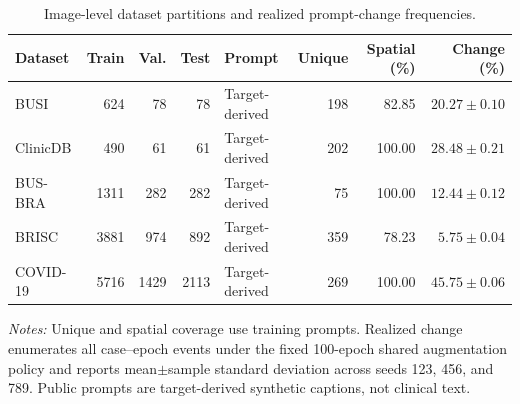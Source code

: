 
\ifnum{}
\begin{table}[htbp]
\centering
\caption{Image-level dataset partitions and realized prompt-change frequencies.}
\label{tab:bspc_dataset_audit}
\scriptsize
\setlength{\tabcolsep}{2.0pt}
\begin{tabular}{@{}lrrrlrrr@{}}
\toprule
Dataset & Train & Val. & Test & Prompt & Unique & Spatial (\%) & Change (\%) \\
\midrule
BUSI     & 624  & 78  & 78   & Target-derived & 198 & 82.85 & $20.27\pm0.10$ \\
ClinicDB & 490  & 61  & 61   & Target-derived & 202 & 100.00 & $28.48\pm0.21$ \\
BUS-BRA  & 1311 & 282 & 282  & Target-derived & 75  & 100.00 & $12.44\pm0.12$ \\
BRISC    & 3881 & 974 & 892  & Target-derived & 359 & 78.23 & $5.75\pm0.04$ \\
COVID-19 & 5716 & 1429& 2113 & Target-derived & 269 & 100.00 & $45.75\pm0.06$ \\
\bottomrule
\end{tabular}
\vspace{2pt}
\begin{minipage}{0.98\linewidth}
\footnotesize\raggedright
\textit{Notes:} Unique and spatial coverage use training prompts. Realized
change enumerates all case--epoch events under the fixed 100-epoch shared
augmentation policy and reports mean$\pm$sample standard deviation across seeds
123, 456, and 789. Public prompts are target-derived synthetic captions, not
clinical text.\par
\end{minipage}
\end{table}
\fi

